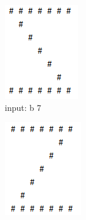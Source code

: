 \begin{figure}[H]
\begin{subfigure}{0.19\linewidth}
            \includegraphics[width=1\linewidth]{../pic/4/4.b.png}
            \caption{input: b 7}
        \end{subfigure}
        \begin{subfigure}{0.19\linewidth}
            \centering
            \includegraphics[width=1\linewidth]{../pic/4/4.c.png}

\end{subfigure}
\end{figure}
